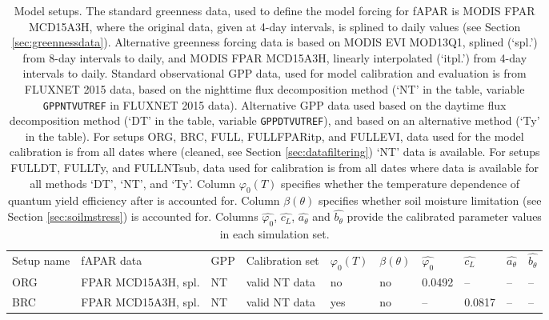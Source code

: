 \documentclass[gmd, manuscript]{copernicus}
\begin{document}
\begin{table}
\caption{Model setups. The standard greenness data, used to define the model forcing for fAPAR is MODIS FPAR MCD15A3H, where the original data, given at 4-day intervals, is splined to daily values (see Section \ref{sec:greennessdata}). Alternative greenness forcing data is based on MODIS EVI MOD13Q1, splined (`spl.') from 8-day intervals to daily, and MODIS FPAR MCD15A3H, linearly interpolated (`itpl.') from 4-day intervals to daily. Standard observational GPP data, used for model calibration and evaluation is from FLUXNET 2015 data, based on the nighttime flux decomposition method (`NT' in the table, variable \texttt{GPP\textunderscore NT\textunderscore VUT\textunderscore REF} in FLUXNET 2015 data). Alternative GPP data used based on the daytime flux decomposition method (`DT' in the table, variable \texttt{GPP\textunderscore DT\textunderscore VUT\textunderscore REF}), and based on an alternative method \citep{wang17natpl} (`Ty' in the table). For setups ORG, BRC, FULL, FULL\textunderscore FPARitp, and FULL\textunderscore EVI, data used for the model calibration is from all dates where (cleaned, see Section \ref{sec:datafiltering}) `NT' data is available. For setups FULL\textunderscore DT, FULL\textunderscore Ty, and FULL\textunderscore NTsub, data used for calibration is from all dates where data is available for all methods `DT', `NT', and `Ty'. Column $\varphi_0(T)$ specifies whether the temperature dependence of quantum yield efficiency after \citet{bernacchi03pce} is accounted for. Column $\beta(\theta )$ specifies whether soil moisture limitation (see Section \ref{sec:soilmstress}) is accounted for. Columns $\widehat{\varphi_0}$, $\widehat{c_L}$, $\widehat{a_{\theta}}$ and $\widehat{b_{\theta}}$ provide the calibrated parameter values in each simulation set.}
\begin{tabular}{llllllllll}
\tophline
    Setup name                 &  fAPAR data              &  GPP      &  Calibration set  &  $\varphi_0(T)$  &  $\beta(\theta )$  &  $\widehat{\varphi_0}$ &  $\widehat{c_L}$    &  $\widehat{a_{\theta}}$  &  $\widehat{b_{\theta}}$   \\
\middlehline
    ORG                        &  FPAR MCD15A3H, spl.     &  NT       &  valid NT data    &  no         &  no         &  0.0492 &  --     &  -- & --   \\
    BRC                        &  FPAR MCD15A3H, spl.     &  NT       &  valid NT data    &  yes        &  no         &  --     &  0.0817 &  -- & --   \\

\end{tabular}
\end{table}
\end{document}
